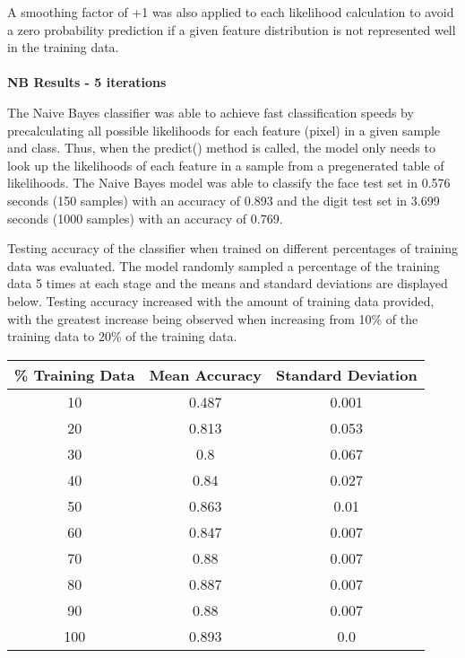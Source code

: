 \documentclass[11pt]{article}
\begin{document}
    A smoothing factor of +1 was also applied to each likelihood calculation to avoid a zero probability prediction if a given feature distribution is not represented well in the training data.\\\\
    \large
    \textbf{NB Results - 5 iterations}
    \normalsize

    The Naive Bayes classifier was able to achieve fast classification speeds by precalculating all possible likelihoods for each feature (pixel) in a given sample and class. Thus, when the predict() method is called, the model only needs to look up the likelihoods of each feature in a sample from a pregenerated table of likelihoods. The Naive Bayes model was able to classify the face test set in 0.576 seconds (150 samples) with an accuracy of 0.893 and the digit test set in 3.699 seconds (1000 samples) with an accuracy of 0.769.

    Testing accuracy of the classifier when trained on different percentages of training data was evaluated. The model randomly sampled a percentage of the training data 5 times at each stage and the means and standard deviations are displayed below. Testing accuracy increased with the amount of training data provided, with the greatest increase being observed when increasing from 10\% of the training data to 20\% of the training data.

    \begin{center}
    \begin{tabular}{||c c c||}
     \hline
     \% Training Data & Mean Accuracy & Standard Deviation \\ [0.5ex]
     \hline\hline
     10 & 0.487 & 0.001 \\
     \hline
     20 & 0.813 & 0.053 \\
     \hline
     30 & 0.8 & 0.067 \\
     \hline
     40 & 0.84 & 0.027 \\
     \hline
     50 & 0.863 & 0.01 \\
     \hline
     60 & 0.847 & 0.007 \\
     \hline
     70 & 0.88 & 0.007 \\
     \hline
     80 & 0.887 & 0.007 \\
     \hline
     90 & 0.88 & 0.007 \\
     \hline
     100 & 0.893 & 0.0 \\
     \hline
    \end{tabular}
    \end{center}
\end{document}

